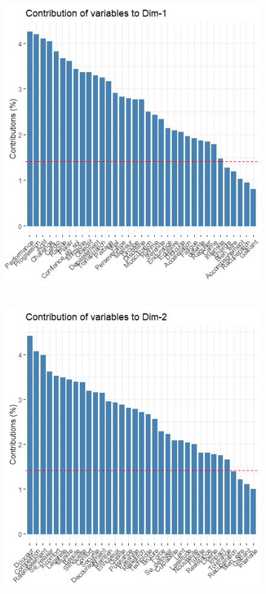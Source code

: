 \documentclass[12pt]{article}
\begin{document}
\begin{figure}[H]
\begin{center}
\includegraphics[scale=1.3]{ACP_2.png} 
\caption[]{\ }
\end{center}
\end{figure}



\begin{figure}[H]
\begin{center}
\includegraphics[scale=1.3]{ACP_3.png} 
\caption[]{\ }
\end{center}
\end{figure}
\end{document}
